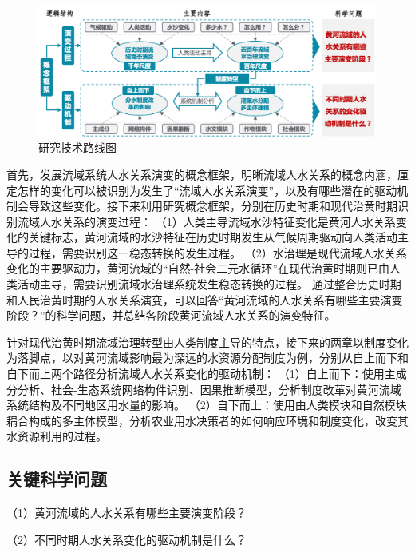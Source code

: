 \begin{figure}[htb] %
    \includegraphics[width=\textwidth]{img/ch1/ch1_workflow.png}
    \caption{研究技术路线图}\label{ch1:fig:workflow}
\end{figure}

首先，发展流域系统人水关系演变的概念框架，明晰流域人水关系的概念内涵，厘定怎样的变化可以被识别为发生了“流域人水关系演变”，以及有哪些潜在的驱动机制会导致这些变化。接下来利用研究概念框架，分别在历史时期和现代治黄时期识别流域人水关系的演变过程：
（1）人类主导流域水沙特征变化是黄河人水关系变化的关键标志，黄河流域的水沙特征在历史时期发生从气候周期驱动向人类活动主导的过程，需要识别这一稳态转换的发生过程。
（2）水治理是现代流域人水关系变化的主要驱动力，黄河流域的“自然-社会二元水循环”在现代治黄时期则已由人类活动主导，需要识别流域水治理系统发生稳态转换的过程。
通过整合历史时期和人民治黄时期的人水关系演变，可以回答“黄河流域的人水关系有哪些主要演变阶段？”的科学问题，并总结各阶段黄河流域人水关系的演变特征。

针对现代治黄时期流域治理转型由人类制度主导的特点，接下来的两章以制度变化为落脚点，以对黄河流域影响最为深远的水资源分配制度为例，分别从自上而下和自下而上两个路径分析流域人水关系变化的驱动机制：
（1）自上而下：使用主成分分析、社会-生态系统网络构件识别、因果推断模型，分析制度改革对黄河流域系统结构及不同地区用水量的影响。
（2）自下而上：使用由人类模块和自然模块耦合构成的多主体模型，分析农业用水决策者的如何响应环境和制度变化，改变其水资源利用的过程。

\subsection{关键科学问题}

（1）黄河流域的人水关系有哪些主要演变阶段？

（2）不同时期人水关系变化的驱动机制是什么？
